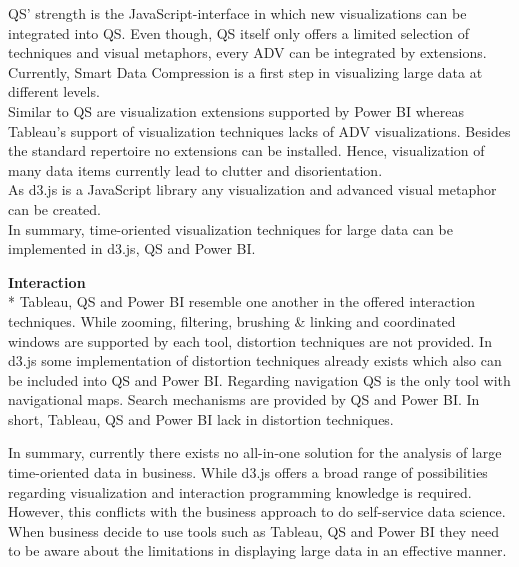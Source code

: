 QS' strength is the JavaScript-interface in which new visualizations can be integrated into QS. Even though, QS itself only offers a limited selection of techniques and visual metaphors, every ADV can be integrated by extensions. Currently, Smart Data Compression is a first step in visualizing large data at different levels.\\
Similar to QS are visualization extensions supported by Power BI whereas Tableau's support of visualization techniques lacks of ADV visualizations. Besides the standard repertoire no extensions can be installed. Hence, visualization of many data items currently lead to clutter and disorientation.\\
As d3.js is a JavaScript library any visualization and advanced visual metaphor can be created.\\
In summary, time-oriented visualization techniques for large data can be implemented in d3.js, QS and Power BI. 
\par
{}
\textbf{Interaction}\\*
Tableau, QS and Power BI resemble one another in the offered interaction techniques. While zooming, filtering, brushing \& linking and coordinated windows are supported by each tool, distortion techniques are not provided. In d3.js some implementation of distortion techniques already exists which also can be included into QS and Power BI. Regarding navigation QS is the only tool with navigational maps. Search mechanisms are provided by QS and Power BI. 
In short, Tableau, QS and Power BI lack in distortion techniques.  
\par
In summary, currently there exists no all-in-one solution for the analysis of large time-oriented data in business. While d3.js offers a broad range of possibilities regarding visualization and interaction programming knowledge is required. However, this conflicts with the business approach to do self-service data science. When business decide to use tools such as Tableau, QS and Power BI they need to be aware about the limitations in displaying large data in an effective manner. 



